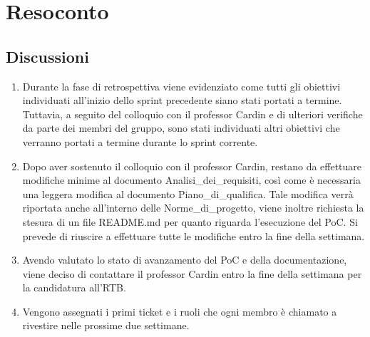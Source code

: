 \section{Resoconto} \label{sec:resoconto}
\subsection{Discussioni} \label{subsec:resdiscussione}
\begin{enumerate}
    \item Durante la fase di retrospettiva viene evidenziato come tutti gli obiettivi individuati all'inizio dello sprint precedente siano stati portati a termine. Tuttavia, a seguito del colloquio con il professor Cardin e di ulteriori verifiche da parte dei membri del gruppo, sono stati individuati altri obiettivi che verranno portati a termine durante lo sprint corrente.
    \item Dopo aver sostenuto il colloquio con il professor Cardin, restano da effettuare modifiche minime al documento Analisi\_dei\_requisiti, così come è necessaria una leggera modifica al documento Piano\_di\_qualifica. Tale modifica verrà riportata anche all'interno delle Norme\_di\_progetto, viene inoltre richiesta la stesura di un file README.md per quanto riguarda l'esecuzione del PoC. Si prevede di riuscire a effettuare tutte le modifiche entro la fine della settimana.
    \item Avendo valutato lo stato di avanzamento del PoC e della documentazione, viene deciso di contattare il professor Cardin entro la fine della settimana per la candidatura all'RTB.
    \item Vengono assegnati i primi ticket e i ruoli che ogni membro è chiamato a rivestire nelle prossime due settimane.
\end{enumerate}



